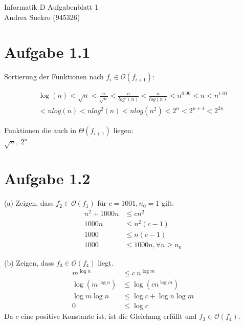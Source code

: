 \documentclass{article}
\begin{document}
\begin{center}
\LARGE Informatik D Aufgabenblatt 1\\
\small Andrea Suckro (945326)
\end{center}
\vspace{0.3cm}
\normalsize

\section*{Aufgabe 1.1}

Sortierung der Funktionen nach $f_i\in\mathcal{O}(f_{i+1})$:

\begin{align*}
  \log(n) 
< \sqrt{n}
< \frac{n}{\sqrt{n}}
< \frac{n}{log^2(n)}
< \frac{n}{log(n)}
< n^{0.99}
< n                   
< n^{1.01} \\
< nlog(n) 
< nlog^2(n)           
< nlog(n^2)
< 2^n 
< 2^{n+1}
< 2^{2n}
\end{align*}

\noindent Funktionen die auch in $\Theta(f_{i+1})$ liegen:\\ %
$\sqrt{n},\ 2^n$

\section*{Aufgabe 1.2}

(a) Zeigen, dass $f_2 \in \mathcal{O}(f_1)$ f\"ur $c=1001,n_0=1$ gilt:
\begin{align*}
n^2+1000n &\leq cn^2 \\
1000n &\leq n^2(c - 1)\\
1000 &\leq n(c-1)\\
1000 &\leq 1000n, \forall n\geq n_0
\end{align*}

\noindent (b) Zeigen, dass $f_3 \in \mathcal{O}(f_4)$ liegt.
\begin{align*}
     m^{\log n}  &\leq      c\ n^{\log m}      \\
\log{\left(m^{\log n}\right)} &\leq \log{\left(c  n^{\log m}\right)}     \\
\log m  \log n   &\leq \log c  + \log n \log m \\
             0   &\leq \log c                    
\end{align*}
\noindent Da $c$ eine positive Konstante ist, ist die Gleichung erf\"ullt und $f_3 \in \mathcal{O}(f_4)$.

\noindent { }
\end{document}

